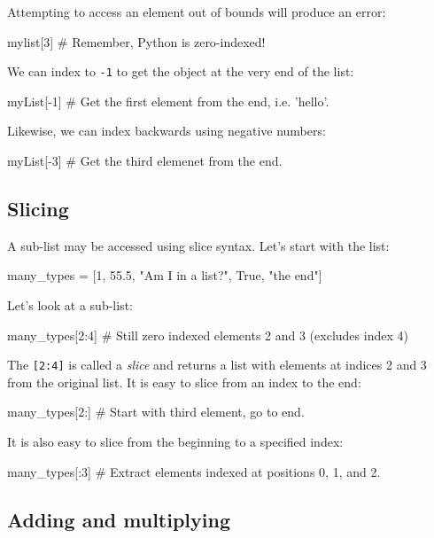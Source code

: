 \documentclass[12pt]{article} \newif\ifsolution\solutiontrue %
\begin{document}
Attempting to access an element out of bounds will produce an error:

\begin{python}
mylist[3]  # Remember, Python is zero-indexed!
\end{python}

We can index to \texttt{-1} to get the object at the very end of the list:

\begin{python}
myList[-1]  # Get the first element from the end, i.e. 'hello'.
\end{python}

Likewise, we can index backwards using negative numbers:

\begin{python}
myList[-3]  # Get the third elemenet from the end.
\end{python}

\subsection{Slicing}\label{slicing}

A sub-list may be accessed using slice syntax. Let's start with the
list:

\begin{python}
many_types = [1, 55.5, "Am I in a list?", True, "the end"]
\end{python}

Let's look at a sub-list:

\begin{python}
many_types[2:4]  # Still zero indexed elements 2 and 3 (excludes index 4)
\end{python}

The \texttt{{[}2:4{]}} is called a \emph{slice} and returns a list with
elements at indices 2 and 3 from the original list.
It is easy to slice from an index to the end:

\begin{python}
many_types[2:]  # Start with third element, go to end.
\end{python}

It is also easy to slice from the beginning to a specified index:

\begin{python}
many_types[:3]  # Extract elements indexed at positions 0, 1, and 2.
\end{python}

\subsection{Adding and multiplying}\label{adding-and-multiplying}
\end{document}
